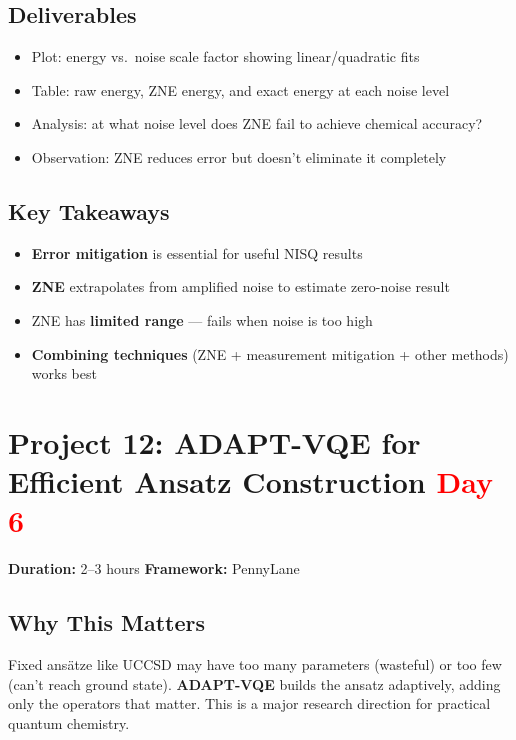 \documentclass[11pt,a4paper]{article}
\begin{document}
\subsection*{Deliverables}
\begin{itemize}
    \item[\checkmark] Plot: energy vs.\ noise scale factor showing linear/quadratic fits
    \item[\checkmark] Table: raw energy, ZNE energy, and exact energy at each noise level
    \item[\checkmark] Analysis: at what noise level does ZNE fail to achieve chemical accuracy?
    \item[\checkmark] Observation: ZNE reduces error but doesn't eliminate it completely
\end{itemize}

\subsection*{Key Takeaways}
\begin{itemize}
    \item \textbf{Error mitigation} is essential for useful NISQ results
    \item \textbf{ZNE} extrapolates from amplified noise to estimate zero-noise result
    \item ZNE has \textbf{limited range} --- fails when noise is too high
    \item \textbf{Combining techniques} (ZNE + measurement mitigation + other methods) works best
\end{itemize}


\section{Project 12: ADAPT-VQE for Efficient Ansatz Construction \hfill \textcolor{red}{\textbf{Day 6}}}

\begin{questionbox}
\textbf{Duration:} 2--3 hours \quad \textbf{Framework:} PennyLane
\end{questionbox}

\subsection*{Why This Matters}
Fixed ansätze like UCCSD may have too many parameters (wasteful) or too few (can't reach ground state). \textbf{ADAPT-VQE} builds the ansatz adaptively, adding only the operators that matter. This is a major research direction for practical quantum chemistry.
\end{document}
